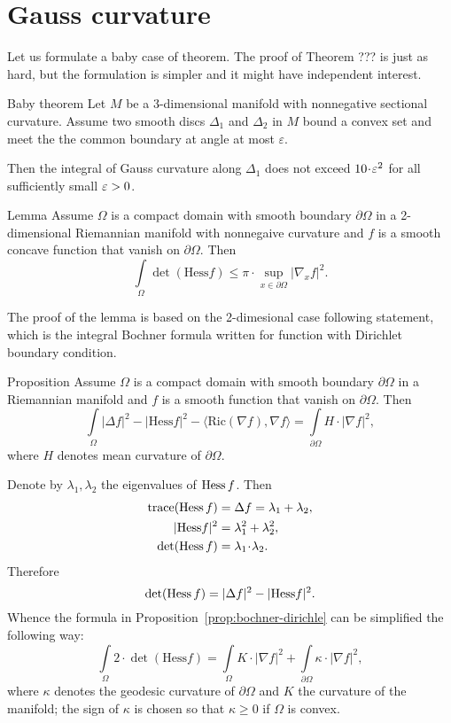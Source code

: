 \section{Gauss curvature}
\label{sec:gauss}

Let us formulate a baby case of theorem.
The proof of Theorem ??? is just as hard, 
but the formulation is simpler and it might have independent interest.

\begin{thm}{Baby theorem}
Let $M$ be a 3-dimensional manifold with nonnegative sectional curvature.
Assume two smooth discs $\Delta_1$ and $\Delta_2$ in $M$ bound a convex set and meet the the common boundary at angle at most $\varepsilon$.

Then the integral of Gauss curvature along $\Delta_1$ does not exceed $10\cdot \eps^2$ for all sufficiently small $\varepsilon>0$.
\end{thm}

\begin{thm}{Lemma}
Assume $\Omega$ is a compact domain with smooth boundary $\partial \Omega$ in a 2-dimensional Riemannian manifold with nonnegaive curvature
and $f$ is a smooth concave function that vanish on $\partial \Omega$.
Then
\[\int\limits_\Omega 
\det(\mathrm{Hess}f)
\le\pi\cdot\sup_{x\in\partial\Omega}|\nabla_x f|^2.\]

\end{thm}

The proof of the lemma is based on the 2-dimesional case  following statement,
which is the integral Bochner formula written for function with Dirichlet boundary condition.

\begin{thm}{Proposition}\label{prop:bochner-dirichle}
Assume $\Omega$ is a compact domain with smooth boundary $\partial \Omega$ in a Riemannian manifold
and $f$ is a smooth function that vanish on $\partial \Omega$.
Then
\[\int\limits_\Omega |\Delta f|^2
-|\mathrm{Hess}f|^2
-\langle\mathrm{Ric}(\nabla f),\nabla f\rangle
=\int\limits_{\partial\Omega}
H\cdot|\nabla f|^2,\]
where $H$ denotes mean curvature of $\partial \Omega$.
\end{thm}

Denote by  $\lambda_1,\lambda_2$ the eigenvalues of  $\operatorname{Hess} f$.
Then
\begin{align*}
\trace(\Hess f)&=\Delta f=\lambda_1+\lambda_2,
\\
|\mathrm{Hess}f|^2&=\lambda_1^2+\lambda_2^2,
\\
\det(\Hess f)&=\lambda_1\cdot\lambda_2.
\end{align*}
Therefore 
\[\det(\operatorname{Hess} f)
=|\Delta f|^2
-|\mathrm{Hess}f|^2.\] 
Whence the formula in Proposition~\ref{prop:bochner-dirichle} can be simplified the following way:
\[\int\limits_\Omega 
2\cdot\det(\mathrm{Hess}f)
=\int\limits_\Omega 
K\cdot|\nabla f|^2
+
\int\limits_{\partial\Omega}
\kappa\cdot|\nabla f|^2,\]
where $\kappa$ denotes the geodesic curvature of $\partial \Omega$ and $K$ the curvature of the manifold; the sign of $\kappa$ is chosen so that $\kappa\ge 0$ if $\Omega$ is convex.

